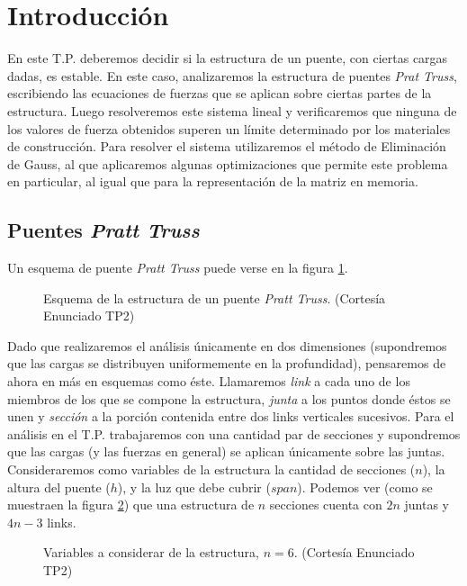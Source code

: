 \section{Introducción}
En este T.P. deberemos decidir si la estructura de un puente, con ciertas cargas dadas, es estable. En este caso, analizaremos la estructura de puentes \emph{Prat Truss}, escribiendo las ecuaciones de fuerzas que se aplican sobre ciertas partes de la estructura. Luego resolveremos este sistema lineal y verificaremos que ninguna de los valores de fuerza obtenidos superen un límite determinado por los materiales de construcción. Para resolver el sistema utilizaremos el método de Eliminación de Gauss, al que aplicaremos algunas optimizaciones que permite este problema en particular, al igual que para la representación de la matriz en memoria. 

\subsection{Puentes \emph{Pratt Truss}}
Un esquema de puente \emph{Pratt Truss} puede verse en la figura \ref{fig:puente}.
\begin{figure}[!ht]
\begin{center}

\caption{Esquema de la estructura de un puente \emph{Pratt Truss}. \small{(Cortesía Enunciado TP2)}}
\label{fig:puente}
\end{center}
\end{figure}

Dado que realizaremos el análisis únicamente en dos dimensiones (supondremos que las cargas se distribuyen uniformemente en la profundidad), pensaremos de ahora en más en esquemas como éste. Llamaremos \emph{link} a cada uno de los miembros de los que se compone la estructura, \emph{junta} a los puntos donde éstos se unen y \emph{sección} a la porción contenida entre dos links verticales sucesivos. Para el análisis en el T.P. trabajaremos con una cantidad par de secciones y supondremos que las cargas (y las fuerzas en general) se aplican únicamente sobre las juntas. Consideraremos como variables de la estructura la cantidad de secciones ($n$), la altura del puente ($h$), y la luz que debe cubrir ($span$). Podemos ver (como se muestraen la figura \ref{fig:estructuras}) que una estructura de $n$ secciones cuenta con $2n$ juntas y $4n-3$ links.

\begin{figure}[!ht]
\begin{center}

\caption{Variables a considerar de la estructura, $n = 6$. \small{(Cortesía Enunciado TP2)}}
\label{fig:estructuras}
\end{center}
\end{figure}


